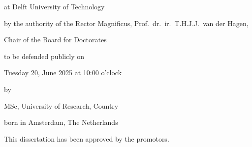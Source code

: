 \documentclass{tudelft}
\begin{document}
\begin{titlepage}
\begin{center}
        at Delft University of Technology

        by the authority of the Rector Magnificus, Prof.~dr.~ir.~T.H.J.J.~van der Hagen,

        Chair of the Board for Doctorates

        to be defended publicly on

        Tuesday 20, June 2025 at 10:00 o'clock

        \bigskip
        \bigskip

        by

        \bigskip
        \bigskip

        \author{}
        
        \bigskip
        \bigskip

        MSc, University of Research, Country

        born in Amsterdam, The Netherlands

        \vspace*{2\bigskipamount}

    \end{center}

    \clearpage
    \thispagestyle{empty}

    \noindent This dissertation has been approved by the promotors.


\end{titlepage}
\end{document}
